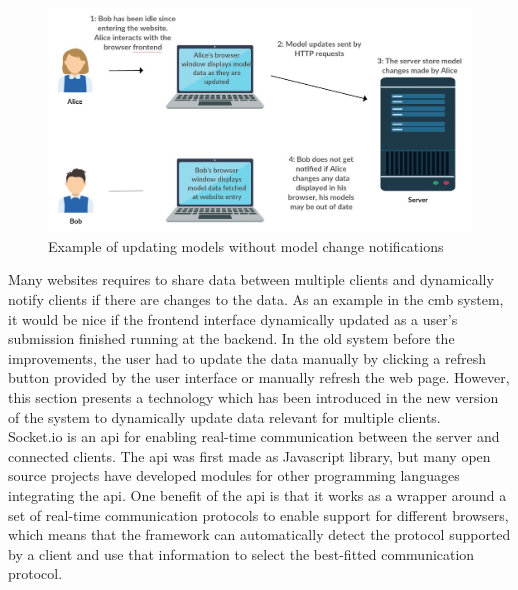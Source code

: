 \begin{figure}
    \centering
    \includegraphics[width=1\textwidth]{figs/update_problem.jpg}
    \caption{Example of updating models without model change notifications}
    \label{fig:update-problem}
\end{figure}

Many websites requires to share data between multiple clients and dynamically notify clients if there are changes to the data. As an example in the \gls{cmb} system, it would be nice if the frontend interface dynamically updated as a user’s submission finished running at the backend. In the old system before the improvements, the user had to update the data manually by clicking a refresh button provided by the user interface or manually refresh the web page. However, this section presents a technology which has been introduced in the new version of the system to dynamically update data relevant for multiple clients. \\

Socket.io \cite{SOCKETIO} is an \gls{api} for enabling real-time communication between the server and connected clients. The \gls{api} was first made as Javascript library, but many open source projects have developed modules for other programming languages integrating the \gls{api}. One benefit of the \gls{api} is that it works as a wrapper around a set of real-time communication protocols to enable support for different browsers, which means that the framework can automatically detect the protocol supported by a client and use that information to select the best-fitted communication protocol. \\

